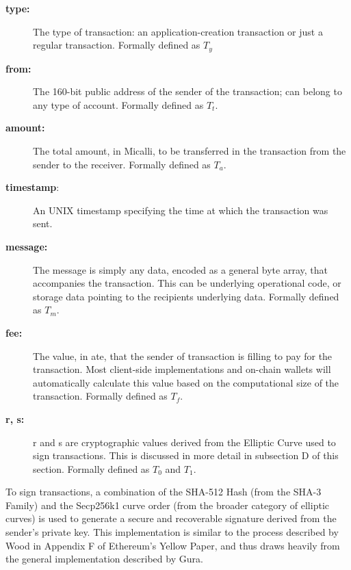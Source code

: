 \documentclass[conference]{IEEEtran}
\begin{document}
\begin{description}
\item[\textbf{type:}]\hspace{3}  The type of transaction: an application-creation transaction or just a regular transaction. Formally defined as $T_y$
\item[\textbf{from:}]\hspace{10} The 160-bit public address of the sender of the transaction; can belong to any type of account. Formally defined as $T_t$.
\item[\textbf{amount:}]\hspace{10} The total amount, in Micalli, to be transferred in the transaction from the sender to the receiver. Formally defined as $T_a$.
\item[\textbf{timestamp}:] An UNIX timestamp specifying the time at which the transaction was sent.


\item[\textbf{message:}]\hspace{10}  The message is simply any data, encoded as a general byte array, that accompanies the transaction. This can be underlying operational code, or storage data pointing to the recipients underlying data. Formally defined as $T_m$.

\item[\textbf{fee:}] The value, in ate, that the sender of transaction is filling to pay for the transaction. Most client-side implementations and on-chain wallets will automatically calculate this value based on the computational size of the transaction. Formally defined as $T_f$.

\item[\textbf{r, s:}] r and s are cryptographic values derived from the Elliptic Curve used to sign transactions. This is discussed in more detail in subsection D of this section. Formally defined as $T_0$ and $T_1$.



\end{description}

To sign transactions, a combination of the SHA-512 Hash (from the SHA-3 Family) and the Secp256k1 curve order (from the broader category of elliptic curves) is used to generate a secure and recoverable signature derived from the sender's private key. This implementation is similar to the process described by Wood in Appendix F of Ethereum's Yellow Paper, and thus draws heavily from the general implementation described by Gura. \cite{guraSECP256k1}
\end{document}
